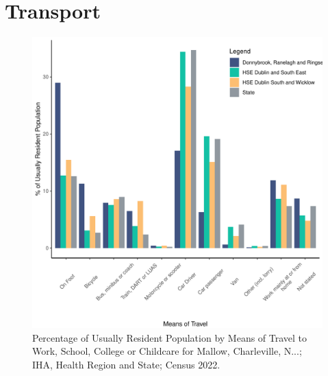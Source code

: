 \documentclass{article}
\begin{document}
\section{Transport}\label{sect:Trans}
\begin{figure}[H]
	\centering
	\includegraphics[width = 120mm]{../figures/TravelED.pdf}
	\caption{Percentage of Usually Resident Population by Means of Travel to Work, School, College or Childcare for Mallow, Charleville, N...; IHA, Health Region and State; Census 2022.}
	\label{fig:vbnv}
	\end{figure}
\end{document}
